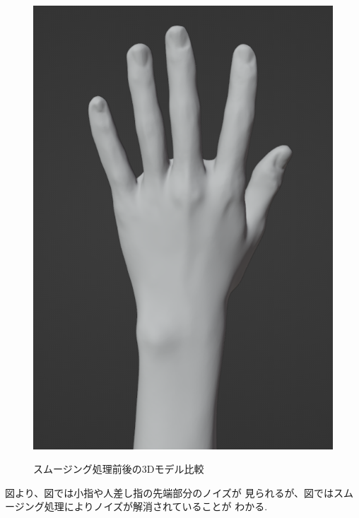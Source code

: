 \documentclass{ltjsreport}
\begin{document}
\begin{figure}[H]
		\hspace{0.04\columnwidth}
		\begin{minipage}{0.32\columnwidth}
		\centering
		\includegraphics[width = \columnwidth]{../figs/SmoothingAfterRear.png}
		\label{fig:smoothingafter}
		\end{minipage}
		\caption{スムージング処理前後の3Dモデル比較}
		\label{fig:smoothing}
		\end{figure}

		図より、図では小指や人差し指の先端部分のノイズが
		見られるが、図ではスムージング処理によりノイズが解消されていることが
		わかる.
\end{document}
